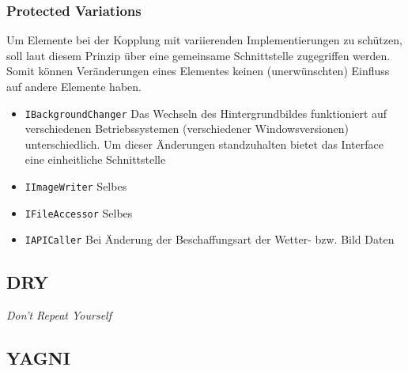 
\subsubsection{Protected Variations}
Um Elemente bei der Kopplung mit variierenden Implementierungen zu schützen, soll laut diesem Prinzip über eine gemeinsame Schnittstelle zugegriffen werden.
Somit können Veränderungen eines Elementes keinen (unerwünschten) Einfluss auf andere Elemente haben.
\begin{itemize}
	\item \texttt{IBackgroundChanger} Das Wechseln des Hintergrundbildes funktioniert auf verschiedenen Betriebssystemen (verschiedener Windowsversionen) unterschiedlich. Um dieser Änderungen standzuhalten bietet das Interface eine einheitliche Schnittstelle
	\item \texttt{IImageWriter} Selbes
	\item \texttt{IFileAccessor} Selbes
	\item \texttt{IAPICaller} Bei Änderung der Beschaffungsart der Wetter- bzw. Bild Daten 
\end{itemize}
\subsection{DRY}
\textit{Don't Repeat Yourself} 
% 
\subsection{YAGNI}
